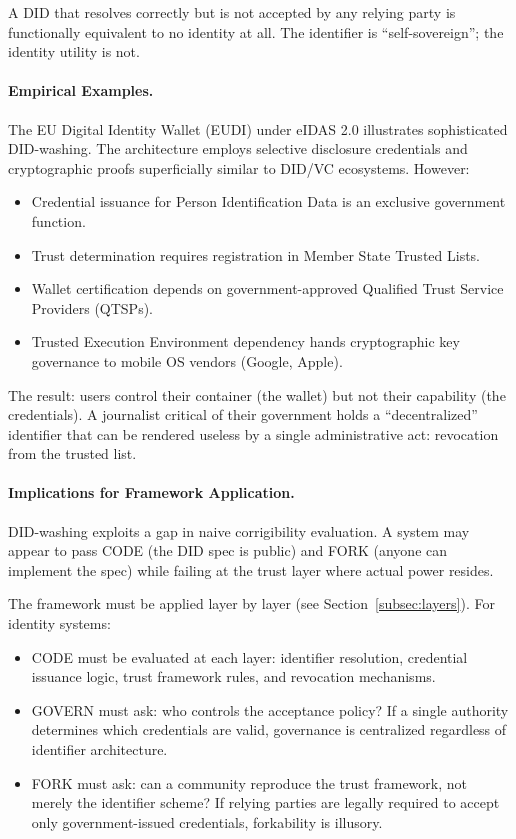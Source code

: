 A DID that resolves correctly but is not accepted by any relying party is functionally equivalent to no identity at all. The identifier is ``self-sovereign''; the identity utility is not.

\paragraph{Empirical Examples.} The EU Digital Identity Wallet (EUDI) under eIDAS 2.0 \citep{eidas2024} illustrates sophisticated DID-washing. The architecture employs selective disclosure credentials and cryptographic proofs superficially similar to DID/VC ecosystems. However:

\begin{itemize}[noitemsep,topsep=0pt]
    \item Credential issuance for Person Identification Data is an exclusive government function.
    \item Trust determination requires registration in Member State Trusted Lists.
    \item Wallet certification depends on government-approved Qualified Trust Service Providers (QTSPs).
    \item Trusted Execution Environment dependency hands cryptographic key governance to mobile OS vendors (Google, Apple).
\end{itemize}

The result: users control their container (the wallet) but not their capability (the credentials). A journalist critical of their government holds a ``decentralized'' identifier that can be rendered useless by a single administrative act: revocation from the trusted list.

\paragraph{Implications for Framework Application.} DID-washing exploits a gap in naive corrigibility evaluation. A system may appear to pass CODE (the DID spec is public) and FORK (anyone can implement the spec) while failing at the trust layer where actual power resides.

The framework must be applied layer by layer (see Section~\ref{subsec:layers}). For identity systems:

\begin{itemize}[noitemsep,topsep=0pt]
    \item CODE must be evaluated at each layer: identifier resolution, credential issuance logic, trust framework rules, and revocation mechanisms.
    \item GOVERN must ask: who controls the acceptance policy? If a single authority determines which credentials are valid, governance is centralized regardless of identifier architecture.
    \item FORK must ask: can a community reproduce the trust framework, not merely the identifier scheme? If relying parties are legally required to accept only government-issued credentials, forkability is illusory.
\end{itemize}


